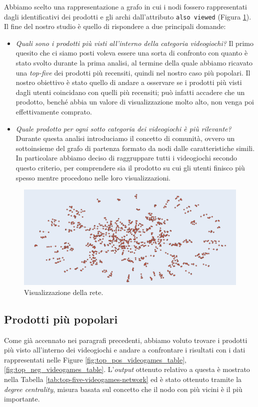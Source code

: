 		Abbiamo scelto una rappresentazione a grafo in cui i nodi fossero rappresentati dagli identificativi dei prodotti e gli archi dall'attributo \verb|also viewed| (Figura \ref{fig:network}).  Il fine del nostro studio è quello di rispondere a due principali domande: 
		\begin{itemize}
			\item \textit{Quali sono i prodotti più visti all'interno della categoria videogiochi?}
			Il primo quesito che ci siamo posti voleva essere una sorta di confronto con quanto è stato svolto durante la prima analisi, al termine della quale abbiamo ricavato una \textit{top-five} dei prodotti più recensiti, quindi nel nostro caso più popolari. Il nostro obiettivo è stato quello di andare a osservare se i prodotti più visti dagli utenti coincidano con quelli più recensiti; può infatti accadere che un prodotto, benché abbia un valore di visualizzazione molto alto, non venga poi effettivamente comprato.
			
			\item \textit{Quale prodotto per ogni sotto categoria dei videogiochi è più rilevante?}
			Durante questa analisi introduciamo il concetto di comunità, ovvero un sottoinsieme del grafo di partenza formato da nodi dalle caratteristiche simili. In particolare abbiamo deciso di raggruppare tutti i videogiochi secondo questo criterio, per comprendere sia il prodotto su cui gli utenti finisco più spesso mentre procedono nelle loro visualizzazioni.
		\end{itemize}
	
		\begin{figure} 
			\includegraphics[width=\textwidth]{Figure/network}
			\caption{Visualizzazione della rete.}
			\label{fig:network}
		\end{figure}
		
		\subsection{Prodotti più popolari}
			Come già accennato nei paragrafi precedenti, abbiamo voluto trovare i prodotti più visto all'interno dei videogiochi e andare a confrontare i risultati con i dati rappresentati nelle Figure \ref{fig:top_pos_videogames_table}, \ref{fig:top_neg_videogames_table}. L'\textit{output} ottenuto relativo a questa è mostrato nella Tabella \ref{tab:top-five-videogames-network} ed è stato ottenuto tramite la \textit{degree centrality}, misura basata sul concetto che il nodo con più vicini è il più importante.
			
